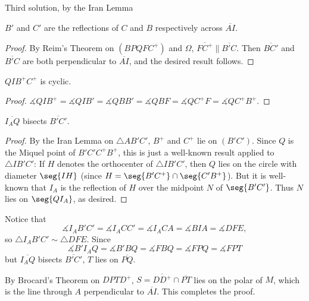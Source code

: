 \begin{customenv}{Third solution, by the Iran Lemma}
    \begin{iclaim}
        $B'$ and $C'$ are the reflections of $C$ and $B$ respectively across $\overline{AI}$.
    \end{iclaim}
    \begin{proof}
        By Reim's Theorem on $(BPQFC^+)$ and $\Omega$, $\overline{FC^+}\parallel\overline{B'C}$. Then $\overline{BC'}$ and $\overline{B'C}$ are both perpendicular to $\overline{AI}$, and the desired result follows.
    \end{proof}
    \begin{iclaim}
        $QIB^+C^+$ is cyclic.
    \end{iclaim}
    \begin{proof}
        $\measuredangle QIB^+=\measuredangle QIB'=\measuredangle QBB'=\measuredangle QBF=\measuredangle QC^+F=\measuredangle QC^+B^+$.
    \end{proof}
    \begin{iclaim}
        $\overline{I_AQ}$ bisects $\overline{B'C'}$.
    \end{iclaim}
    \begin{proof}
        By the Iran Lemma on $\triangle AB'C'$, $B^+$ and $C^+$ lie on $(B'C')$. Since $Q$ is the Miquel point of $B'C'C^+B^+$, this is just a well-known result applied to $\triangle IB'C'$: If $H$ denotes the orthocenter of $\triangle IB'C'$, then $Q$ lies on the circle with diameter $\seg{IH}$ (since $H=\seg{B'C^+}\cap\seg{C'B^+}$). But it is well-known that $I_A$ is the reflection of $H$ over the midpoint $N$ of $\seg{B'C'}$. Thus $N$ lies on $\seg{QI_A}$, as desired.
    \end{proof}

    Notice that \[\measuredangle I_AB'C'=\measuredangle I_ACC'=\measuredangle I_ACA=\measuredangle BIA=\measuredangle DFE,\]so $\triangle I_AB'C'\sim\triangle DFE$. Since \[\measuredangle B'I_AQ=\measuredangle B'BQ=\measuredangle FBQ=\measuredangle FPQ=\measuredangle FPT\]but $\overline{I_AQ}$ bisects $\overline{B'C'}$, $T$ lies on $\overline{PQ}$.

    By Brocard's Theorem on $DPTD^+$, $S=\overline{DD^+}\cap\overline{PT}$ lies on the polar of $M$, which is the line through $A$ perpendicular to $\overline{AI}$. This completes the proof.
\end{customenv}
